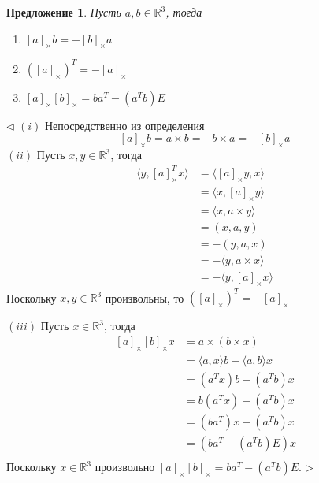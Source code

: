 \documentclass[12pt]{article}
\newtheorem{proposition}[theorem]{Предложение}
\newenvironment{proof}{\par $\triangleleft$}{$\triangleright$}
\begin{document}
\begin{proposition}
    Пусть $a, b\in\mathbb{R}^3$, тогда
    \begin{enumerate}[label = (\roman*)]
        \item $[a]_\times b=-[b]_\times a$
        \item $([a]_\times)^T=-[a]_\times$
        \item $[a]_\times [b]_\times=b a^T - (a^T b) E$
    \end{enumerate}
\end{proposition}
\begin{proof}
    $(i)$ Непосредственно из определения
    $$
        [a]_\times b=a \times b=-b \times a=-[b]_\times a
    $$
    $(ii)$ Пусть $x,y\in\mathbb{R}^3$, тогда
    $$
        \begin{aligned}
            \langle y, [a]_\times^T x\rangle
             & =\langle [a]_\times y, x\rangle  \\
             & =\langle x, [a]_\times y\rangle  \\
             & =\langle x, a\times y\rangle     \\
             & =(x, a, y)                       \\
             & =-(y, a, x)                      \\
             & =-\langle y, a\times x\rangle    \\
             & =-\langle y, [a]_\times x\rangle
        \end{aligned}
    $$
    Поскольку $x,y\in\mathbb{R}^3$ произвольны, то $([a]_\times)^T=-[a]_\times$

    $(iii)$ Пусть $x\in\mathbb{R}^3$, тогда
    $$
        \begin{aligned}
            \,[a]_\times [b]_\times x
             & = a \times (b \times x)                        \\
             & =\langle a, x\rangle b - \langle a, b\rangle x \\
             & =(a^T x) b - (a^T b) x                         \\
             & =b(a^T x) - (a^T b) x                          \\
             & =(b a^T) x - (a^T b) x                         \\
             & =(b a^T  - (a^T b) E)x                         \\
        \end{aligned}
    $$
    Поскольку $x\in\mathbb{R}^3$
    произвольно $[a]_\times [b]_\times=b a^T - (a^T b) E$.
\end{proof}
\end{document}
